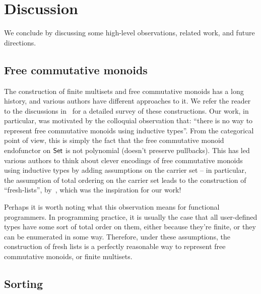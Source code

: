 \section{Discussion}
\label{sec:discussion}

We conclude by discussing some high-level observations, related work, and future directions.

\subsection*{Free commutative monoids}

The construction of finite multisets and free commutative monoids has a long history, and various authors have different
approaches to it. We refer the reader to the discussions
in~\cite*{choudhuryFreeCommutativeMonoids2023,joramConstructiveFinalSemantics2023} for a detailed survey of these
constructions.
%
Our work, in particular, was motivated by the colloquial observation that:
``there is no way to represent free commutative monoids using inductive types''.
%
From the categorical point of view, this is simply the fact that the free commutative monoid endofunctor on $\mathsf{Set}$ is
not polynomial (doesn't preserve pullbacks).
%
This has led various authors to think about clever encodings of free commutative monoids using inductive types by adding
assumptions on the carrier set -- in particular, the assumption of total ordering on the carrier set leads to the
construction of ``fresh-lists'', by~\cite{kupkeFreshLookCommutativity2023}, which was the inspiration for our work!

Perhaps it is worth noting what this observation means for functional programmers.
%
In programming practice, it is usually the case that all user-defined types have some sort of total order on them,
either because they're finite, or they can be enumerated in some way.
%
Therefore, under these assumptions, the construction of fresh lists is a perfectly reasonable way to represent free
commutative monoids, or finite multisets.

\subsection*{Sorting}

